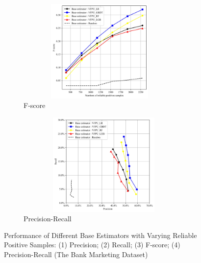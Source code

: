 \documentclass[10pt,journal,compsoc]{IEEEtran}
\begin{document}
\begin{figure}[!htbp]
	\begin{subfigure}{0.45\textwidth}
		\centering
		\captionsetup{skip=4pt}
		\captionsetup{size=scriptsize}
		\includegraphics[width=0.9\textwidth,height=5.1cm]{./Figure 2 (3) in JEPG format}
		\caption{F-score}
		\label{RQ2.1.sub3}
	\end{subfigure}
	\begin{subfigure}{0.45\textwidth}
		\centering
		\captionsetup{skip=4pt}
		\captionsetup{size=scriptsize}
		\includegraphics[width=0.95\textwidth,height=5.1cm]{./Figure 2 (4) in JEPG format}
		\caption{Precision-Recall}
		\label{RQ2.1.sub4}
	\end{subfigure}
	
	\caption{Performance of Different Base Estimators with Varying Reliable Positive Samples: (1) Precision; (2) Recall; (3) F-score; (4) Precision-Recall (The Bank Marketing Dataset)}
	\label{RQ2.1}
\end{figure}
\end{document}
